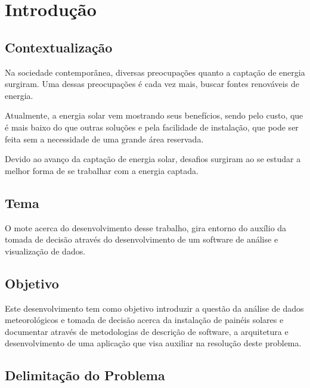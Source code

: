 \chapter{Introdução}

\section{Contextualização}

Na sociedade contemporânea, diversas preocupações quanto a captação de energia surgiram. Uma dessas preocupações é cada vez mais, buscar fontes renováveis de energia.

Atualmente, a energia solar vem mostrando seus benefícios, sendo pelo custo, que é mais baixo do que outras soluções e pela facilidade de instalação, que pode ser feita sem a necessidade de uma grande área reservada.

Devido ao avanço da captação de energia solar, desafios surgiram ao se estudar a melhor forma de se trabalhar com a energia captada.

\section{Tema}

O mote acerca do desenvolvimento desse trabalho, gira entorno do auxílio da tomada de decisão através do desenvolvimento de um software de análise e visualização de dados.

\section{Objetivo}

Este desenvolvimento tem como objetivo introduzir a questão da análise de dados meteorológicos e tomada de decisão acerca da instalação de painéis solares e documentar através de metodologias de descrição de software, a arquitetura e desenvolvimento de uma aplicação que visa auxiliar na resolução deste problema.

\section{Delimitação do Problema}

